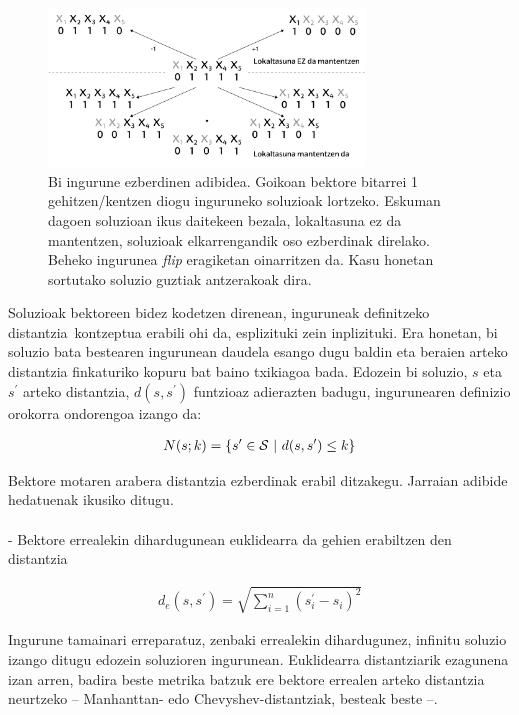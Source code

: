 \documentclass[eu]{ifirak}\usepackage[]{graphicx}\usepackage[]{color}
\newcommand{\zkk}{\guillemotleft}
\newcommand{\skk}{\guillemotright}
\begin{document}
\begin{figure}[t]
\centering
\includegraphics [width=0.75\textwidth]{./Irudiak/lokaltasuna}
\caption{Bi ingurune ezberdinen adibidea. Goikoan bektore bitarrei 1 gehitzen/kentzen diogu inguruneko soluzioak lortzeko. Eskuman dagoen soluzioan ikus daitekeen bezala, lokaltasuna ez da mantentzen, soluzioak elkarrengandik oso ezberdinak direlako. Beheko ingurunea \textit{flip} eragiketan oinarritzen da. Kasu honetan sortutako soluzio guztiak antzerakoak dira.}
\label{fig:locality}
\end{figure}

Soluzioak bektoreen bidez kodetzen direnean, inguruneak definitzeko \zkk distantzia\skk\ kontzeptua erabili ohi da, esplizituki zein inplizituki. Era honetan, bi soluzio bata bestearen ingurunean daudela esango dugu baldin eta beraien arteko distantzia finkaturiko kopuru bat baino txikiagoa bada. Edozein bi soluzio, $s$ eta $s^\prime$ arteko distantzia, $d(s,s^\prime)$ funtzioaz adierazten badugu, ingurunearen definizio orokorra ondorengoa izango da:

\begin{align}
N(s;k) = \{s^\prime\in {\cal S}\ |\ d(s,s^\prime)\leq k\}
\end{align}

Bektore motaren arabera distantzia ezberdinak erabil ditzakegu. Jarraian adibide hedatuenak ikusiko ditugu.
\paragraph{}
 - Bektore errealekin dihardugunean euklidearra da gehien erabiltzen den distantzia

\begin{eqnarray*}
d_e(s,s^\prime) = \sqrt{\sum_{i=1}^n (s_i^\prime - s_i)^2}
\end{eqnarray*}

Ingurune tamainari erreparatuz, zenbaki errealekin dihardugunez, infinitu soluzio izango ditugu edozein soluzioren ingurunean. Euklidearra distantziarik ezagunena izan arren, badira beste metrika batzuk ere bektore errealen arteko distantzia neurtzeko -- Manhanttan- edo Chevyshev-distantziak, besteak beste --.
\end{document}
